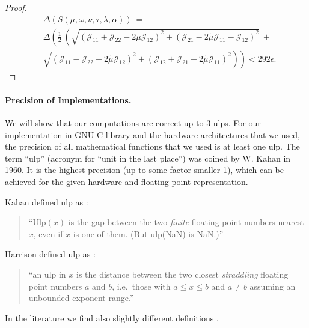 \documentclass{article}
\newcommand\munn{{\tilde \mu}}
\renewcommand{\leq}{\leqslant}
\begin{document}
\begin{proof}
\begin{align}
& \Delta \left(S(\mu,\omega,\nu,\tau,\lambda ,\alpha ) \right)\ = \\ \nonumber
& \Delta \left( \frac{1}{2} \ \left(\sqrt{({\mathcal J}_{11}+{\mathcal J}_{22} - 2 \munn {\mathcal J}_{12})^2+({\mathcal J}_{21} - 2 \munn {\mathcal J}_{11}-{\mathcal J}_{12})^2} \ + \right. \right.\\ \nonumber
& \left. \left. \sqrt{({\mathcal J}_{11}-{\mathcal J}_{22} + 2 \munn {\mathcal J}_{12})^2+({\mathcal J}_{12}+{\mathcal J}_{21} - 2 \munn {\mathcal J}_{11})^2} \right)\right) < 292 \epsilon.
\end{align}
\end{proof}




\paragraph{Precision of Implementations.}
We will show that our computations are correct up to 3 ulps. For
our implementation in GNU C library and the hardware architectures
that we used, the precision of all mathematical functions that we used
is at least one ulp.
The term ``ulp'' (acronym for ``unit in the last place'') was coined
by W. Kahan in 1960. It is the highest precision (up to some factor
smaller 1), which can be
achieved for the given hardware and floating point representation.

Kahan defined ulp as \citep{Kahan:04}:
\begin{quote}
``Ulp$(x)$ is the gap between the two {\em finite} floating-point numbers
nearest $x$, even if $x$ is one of them. (But ulp(NaN) is NaN.)''
\end{quote}
Harrison defined ulp as \citep{Harrison:99}:
\begin{quote}
``an ulp in $x$ is the distance
between the two closest {\em straddling} floating point numbers $a$ and $b$, i.e.\ those with
$a \leq x \leq b$ and $a \not= b$ assuming an unbounded exponent range.''
\end{quote}
In the literature we find also slightly different definitions
\citep{Muller:05}.
\end{document}
